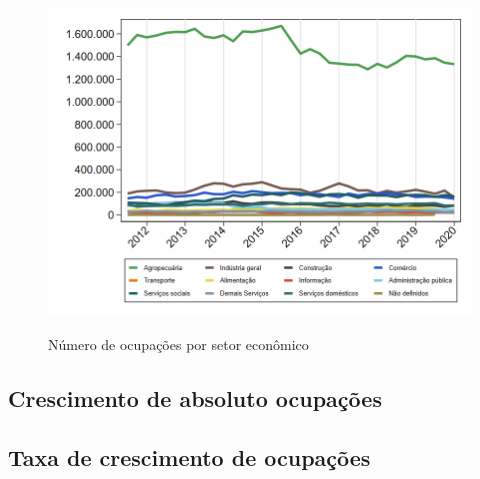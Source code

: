 \documentclass[10pt]{beamer}
\begin{document}
\begin{frame}
\textit{\hyperlink{indice_principal_amz_rural}{}}
\begin{figure}
  \centering
  \includegraphics[width=.85\linewidth]{./../analysis/output/_amz_rural_importancia_relativa.png}
  \label{_amz_rural_importancia_relativa}
  \caption{{Número de ocupações por setor econômico}}
\end{figure}
\end{frame}

\subsection{Crescimento de absoluto ocupações}

\begin{frame}
\textit{\hyperlink{indice_principal_amz_rural}{}}

\end{frame}

\begin{frame}
\textit{\hyperlink{indice_principal_amz_rural}{}}

\end{frame}

\begin{frame}
\textit{\hyperlink{indice_principal_amz_rural}{}}

\end{frame}

\subsection{Taxa de crescimento de ocupações}
\end{document}
